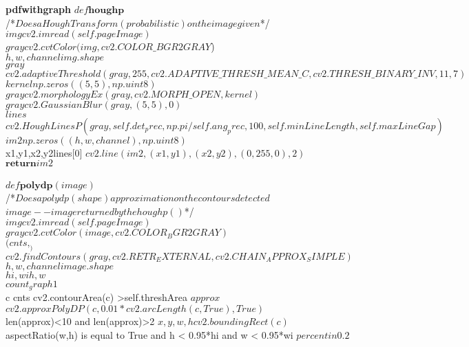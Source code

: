 \documentclass[12pts]{scrreprt}
\begin{document}
\begin{pseudocode}{\textbf{pdfwithgraph}}{ }
$def \textbf{houghp} $\\
/\mbox{*}$Does a Hough Transform (probabilistic) on the image given$\mbox{*}/\\
$img$\GETS$cv2.imread(self.pageImage)$\\
$gray$\GETS$cv2.cvtColor(img,cv2.COLOR\_BGR2GRAY$)\\
$h,w,channel$\GETS$img.shape$\\
$gray$\GETS$cv2.adaptiveThreshold(gray,255,cv2.ADAPTIVE\_THRESH\_MEAN\_C,cv2.THRESH\_BINARY\_INV,11,7)$\\
$kernel$\GETS$ np.zeros((5,5),np.uint8)$\\
$gray$\GETS$cv2.morphologyEx(gray, cv2.MORPH\_OPEN, kernel)$\\
$gray$\GETS$cv2.GaussianBlur(gray,(5,5),0)$\\
$lines$\GETS$cv2.HoughLinesP(gray,self.det_prec,np.pi/self.ang_prec,100,self.minLineLength,self.maxLineGap)$\\
$im2$\GETS$np.zeros((h,w,channel),np.uint8)$\\
\FOREACH x1,y1,x2,y2\in lines[0] \DO
\BEGIN 
$cv2.line(im2,(x1,y1),(x2,y2),(0,255,0),2)$\\
$\textbf{return} im2$\\
\END \\
$def \textbf{polydp}(image)$\\
/\mbox{*}$Does a polydp (shape) approximation on the contours detected$\\
$image--image returned by the houghp()$\mbox{*}/\\
$img$\GETS$cv2.imread(self.pageImage)$\\
$gray$\GETS$cv2.cvtColor(image,cv2.COLOR_BGR2GRAY)$\\
$(cnts, _)$\GETS$cv2.findContours(gray, cv2.RETR_EXTERNAL,cv2.CHAIN_APPROX_SIMPLE)$\\
$h,w,channel$\GETS$image.shape$\\
$hi,wi$\GETS$h,w$\\
$count_graph$\GETS$1$\\
\FOREACH c \in cnts\DO
\BEGIN 
\IF cv2.contourArea(c) >self.threshArea \THEN
\BEGIN 
$approx$\GETS$cv2.approxPolyDP(c,0.01*cv2.arcLength(c,True),True)$\\
\IF len(approx)<10 and len(approx)>2 \THEN
\BEGIN
$x,y,w,h$\GETS$cv2.boundingRect(c)$\\
\IF aspectRatio(w,h) is equal to True and h < 0.95*hi and w < 0.95*wi \THEN
\BEGIN 
$percentin$\GETS$0.2$\\

\end{pseudocode}
\end{document}

